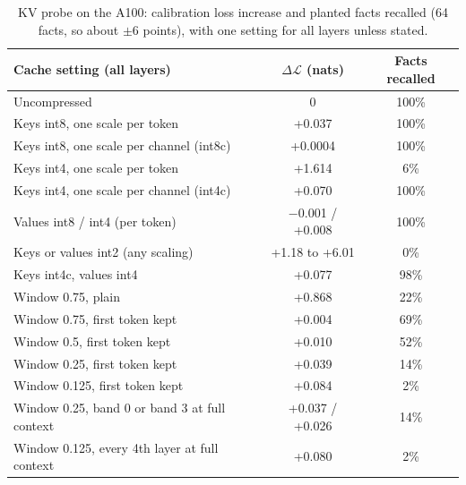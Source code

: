 \documentclass[11pt]{article}
\newcommand{\dloss}{\Delta\mathcal{L}}
\begin{document}
\begin{table}[htbp]
\centering
\small
\begin{tabular}{lcc}
\toprule
Cache setting (all layers) & $\dloss$ (nats) & Facts recalled \\
\midrule
Uncompressed                                         & 0       & 100\% \\
\midrule
Keys int8, one scale per token                       & +0.037  & 100\% \\
Keys int8, one scale per channel (int8c)             & +0.0004 & 100\% \\
Keys int4, one scale per token                       & +1.614  & 6\%   \\
Keys int4, one scale per channel (int4c)             & +0.070  & 100\% \\
Values int8 / int4 (per token)                       & $-$0.001 / +0.008 & 100\% \\
Keys or values int2 (any scaling)                    & +1.18 to +6.01 & 0\% \\
Keys int4c, values int4                              & +0.077  & 98\%  \\
\midrule
Window 0.75, plain                                   & +0.868  & 22\%  \\
Window 0.75, first token kept                        & +0.004  & 69\%  \\
Window 0.5, first token kept                         & +0.010  & 52\%  \\
Window 0.25, first token kept                        & +0.039  & 14\%  \\
Window 0.125, first token kept                       & +0.084  & 2\%   \\
Window 0.25, band 0 or band 3 at full context        & +0.037 / +0.026 & 14\% \\
Window 0.125, every 4th layer at full context        & +0.080  & 2\%   \\
\bottomrule
\end{tabular}
\caption{KV probe on the A100: calibration loss increase and planted facts recalled (64 facts, so about
$\pm6$ points), with one setting for all layers unless stated.}
\label{tab:kv-probe}
\end{table}
\end{document}
